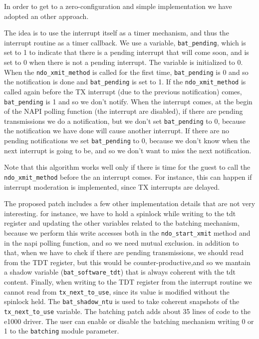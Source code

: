 In order to get to a zero-configuration and simple implementation we have adopted an other approach.

\vspace{0.5cm}

The idea is to use the interrupt itself as a timer mechanism, and thus the interrupt routine as a timer callback.
We use a variable, \texttt{bat\_pending}, which is set to 1 to indicate that there is a pending interrupt that will come soon, and is set 
to 0 when there is not a pending interrupt. The variable is initialized to 0.
When the \texttt{ndo\_xmit\_method} is called for the first time, \texttt{bat\_pending} is 0 and so the notification is done and 
\texttt{bat\_pending} is set to 1.
If the \texttt{ndo\_xmit\_method} is called again before the TX interrupt (due to the previous notification) comes, \texttt{bat\_pending}
is 1 and so we don't notify.
When the interrupt comes, at the begin of the NAPI polling function (the interrupt are disabled), if there are pending transmissions we do 
a notification, but we don't set \texttt{bat\_pending} to 0, because the notification we have done will cause another interrupt.
If there are no pending notifications we set \texttt{bat\_pending} to 0, because we don't know when the next interrupt is going to be, and
so we don't want to miss the next notification.

Note that this algorithm works well only if there is time for the guest to call the \texttt{ndo\_xmit\_method} before the an interrupt
comes. For instance, this can happen if interrupt moderation is implemented, since TX interrupts are delayed.

\vspace{0.5cm}

The proposed patch includes a few other implementation details that are not very interesting. for instance, we have to hold a spinlock
while writing to the tdt register and updating the other variables related to the batching mechanism, because we perform this write
accesses both in the \texttt{ndo\_start\_xmit} method and in the napi polling function, and so we need mutual exclusion.
in addition to that, when we have to chek if there are pending transmissions, we should read from the TDT register, but this would be 
counter-productive,and so we mantain a shadow variable (\texttt{bat\_software\_tdt}) that is always coherent with the tdt content.
Finally, when writing to the TDT register from the interrupt routine we cannot read from \texttt{tx\_next\_to\_use}, since its value
is modified without the spinlock held. The \texttt{bat\_shadow\_ntu} is used to take coherent snapshots of the \texttt{tx\_next\_to\_use}
variable.
The batching patch adds about 35 lines of code to the e1000 driver.
The user can enable or disable the batching mechanism writing 0 or 1 to the \texttt{batching} module parameter.


